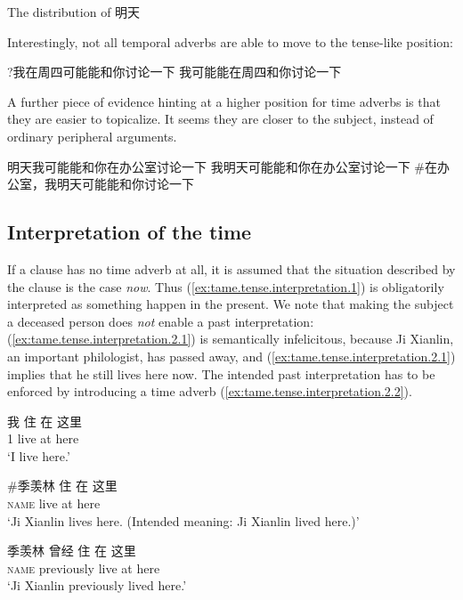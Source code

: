 \documentclass[UTF8, a4paper, oneside, scheme=plain, 12pt]{ctexrep}
\newcommand{\translate}[1]{`#1'}
\newcommand*{\category}[1]{\textsc{#1}}
\begin{document}
The distribution of 明天 

Interestingly, not all temporal adverbs are able to move to the tense-like position: 

\begin{exe}
    \ex \begin{xlist}
        \ex ?我在周四可能能和你讨论一下
        \ex 我可能能在周四和你讨论一下
    \end{xlist}
\end{exe}




A further piece of evidence hinting at a higher position for time adverbs 
is that they are easier to topicalize.
It seems they are closer to the subject, 
instead of ordinary peripheral arguments.

\begin{exe}
    \ex 明天我可能能和你在办公室讨论一下
    \ex 我明天可能能和你在办公室讨论一下
    \ex \#在办公室，我明天可能能和你讨论一下
\end{exe}


\subsection{Interpretation of the time}

If a clause has no time adverb at all,
it is assumed that the situation described by the clause 
is the case \emph{now}.
Thus (\ref{ex:tame.tense.interpretation.1}) is obligatorily interpreted as something happen in the present.
We note that making the subject a deceased person does \emph{not}
enable a past interpretation:
(\ref{ex:tame.tense.interpretation.2.1}) is semantically infelicitous,
because Ji Xianlin, an important philologist, has passed away,
and (\ref{ex:tame.tense.interpretation.2.1}) implies that he still lives here now.
The intended past interpretation has to be enforced by introducing a time adverb
(\ref{ex:tame.tense.interpretation.2.2}).

\begin{exe}
    \ex\label{ex:tame.tense.interpretation.1} 
    \gll 我 住 在 这里 \\
    1 live at here \\
    \glt\translate{I live here.}

    \ex\label{ex:tame.tense.interpretation.2} 
    \begin{xlist}
        \ex\label{ex:tame.tense.interpretation.2.1} 
        \gll \#季羡林 住 在 这里  \\
        \category{name} live at here \\
        \glt\translate{Ji Xianlin lives here. (Intended meaning: Ji Xianlin lived here.)}

        \ex\label{ex:tame.tense.interpretation.2.2} 
        \gll 季羡林 曾经 住 在 这里  \\
        \category{name} previously live at here \\
        \glt\translate{Ji Xianlin previously lived here.}
    \end{xlist}
\end{exe}
\end{document}
